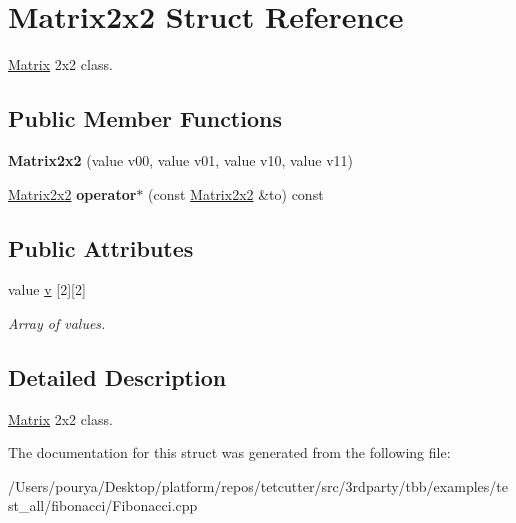 \hypertarget{structMatrix2x2}{}\section{Matrix2x2 Struct Reference}
\label{structMatrix2x2}


\hyperlink{classMatrix}{Matrix} 2x2 class.  


\subsection*{Public Member Functions}
\begin{DoxyCompactItemize}
\item 
\hypertarget{structMatrix2x2_ae0c129aa985fc2590cab6b0b3b741fc7}{}{\bfseries Matrix2x2} (value v00, value v01, value v10, value v11)\label{structMatrix2x2_ae0c129aa985fc2590cab6b0b3b741fc7}

\item 
\hypertarget{structMatrix2x2_aa505d1fb3276564e40457c22c3d75147}{}\hyperlink{structMatrix2x2}{Matrix2x2} {\bfseries operator$\ast$} (const \hyperlink{structMatrix2x2}{Matrix2x2} \&to) const \label{structMatrix2x2_aa505d1fb3276564e40457c22c3d75147}

\end{DoxyCompactItemize}
\subsection*{Public Attributes}
\begin{DoxyCompactItemize}
\item 
\hypertarget{structMatrix2x2_a760ff734abc98e0ca87d98f65e14428c}{}value \hyperlink{structMatrix2x2_a760ff734abc98e0ca87d98f65e14428c}{v} \mbox{[}2\mbox{]}\mbox{[}2\mbox{]}\label{structMatrix2x2_a760ff734abc98e0ca87d98f65e14428c}

\begin{DoxyCompactList}\small\item\em Array of values. \end{DoxyCompactList}\end{DoxyCompactItemize}


\subsection{Detailed Description}
\hyperlink{classMatrix}{Matrix} 2x2 class. 

The documentation for this struct was generated from the following file\+:\begin{DoxyCompactItemize}
\item 
/\+Users/pourya/\+Desktop/platform/repos/tetcutter/src/3rdparty/tbb/examples/test\+\_\+all/fibonacci/Fibonacci.\+cpp\end{DoxyCompactItemize}
